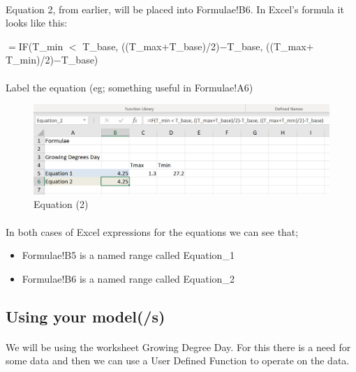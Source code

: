 \documentclass[12pt,a4paper,twoside,openright,titlepage]{article}
\begin{document}
\paragraph{} Equation 2, from earlier, will be placed into Formulae!B6. In Excel's formula it looks like this:

$=$IF(T\_min $<$ T\_base, ((T\_max$+$T\_base)/2)$-$T\_base, ((T\_max$+$T\_min)/2)$-$T\_base)

\paragraph{} Label the equation (eg; something useful in Formulae!A6)

\begin{figure}[h!]
	\centering
	\includegraphics[scale=0.7]{images/equation_2.PNG}
	\caption{Equation (2)}
\end{figure}

\paragraph{} In both cases of Excel expressions for the equations we can see that;

\begin{itemize}
	\item Formulae!B5 is a named range called Equation\_1
	\item Formulae!B6 is a named range called Equation\_2
\end{itemize}


\subsection{Using your model(/s)}

\paragraph{} We will be using the worksheet Growing Degree Day. For this there is a need for some data and then we can use a User Defined Function to operate on the data.
\end{document}
